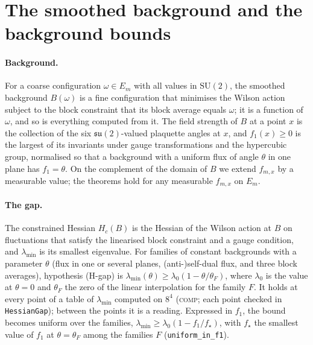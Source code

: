 \documentclass[11pt,a4paper]{article}
\theoremstyle{definition}
\theoremstyle{remark}
\newcommand{\tagC}{\textsc{comp}}
\newcommand{\lt}[1]{\texttt{#1}}
\begin{document}
\section{The smoothed background and the background bounds}\label{app:background}

\paragraph{Background.} For a coarse configuration $\omega\in E_m$ with all values in $\mathrm{SU}(2)$, the smoothed background $B(\omega)$ is a fine configuration that minimises the Wilson action subject to the block constraint that its block average equals $\omega$; it is a function of $\omega$, and so is everything computed from it. The field strength of $B$ at a point $x$ is the collection of the six $\mathfrak{su}(2)$-valued plaquette angles at $x$, and $f_1(x)\ge0$ is the largest of its invariants under gauge transformations and the hypercubic group, normalised so that a background with a uniform flux of angle $\theta$ in one plane has $f_1=\theta$. On the complement of the domain of $B$ we extend $f_{m,x}$ by a measurable value; the theorems hold for any measurable $f_{m,x}$ on $E_m$.

\paragraph{The gap.} The constrained Hessian $H_c(B)$ is the Hessian of the Wilson action at $B$ on fluctuations that satisfy the linearised block constraint and a gauge condition, and $\lambda_{\min}$ is its smallest eigenvalue. For families of constant backgrounds with a parameter $\theta$ (flux in one or several planes, (anti-)self-dual flux, and three block averages), hypothesis (H-gap) is $\lambda_{\min}(\theta)\ge\lambda_0(1-\theta/\theta_F)$, where $\lambda_0$ is the value at $\theta=0$ and $\theta_F$ the zero of the linear interpolation for the family $F$. It holds at every point of a table of $\lambda_{\min}$ computed on $8^4$ (\tagC; each point checked in \lt{HessianGap}); between the points it is a reading. Expressed in $f_1$, the bound becomes uniform over the families, $\lambda_{\min}\ge\lambda_0(1-f_1/f_\star)$, with $f_\star$ the smallest value of $f_1$ at $\theta=\theta_F$ among the families $F$ (\lt{uniform\_\allowbreak{}in\_\allowbreak{}f1}).
\end{document}
